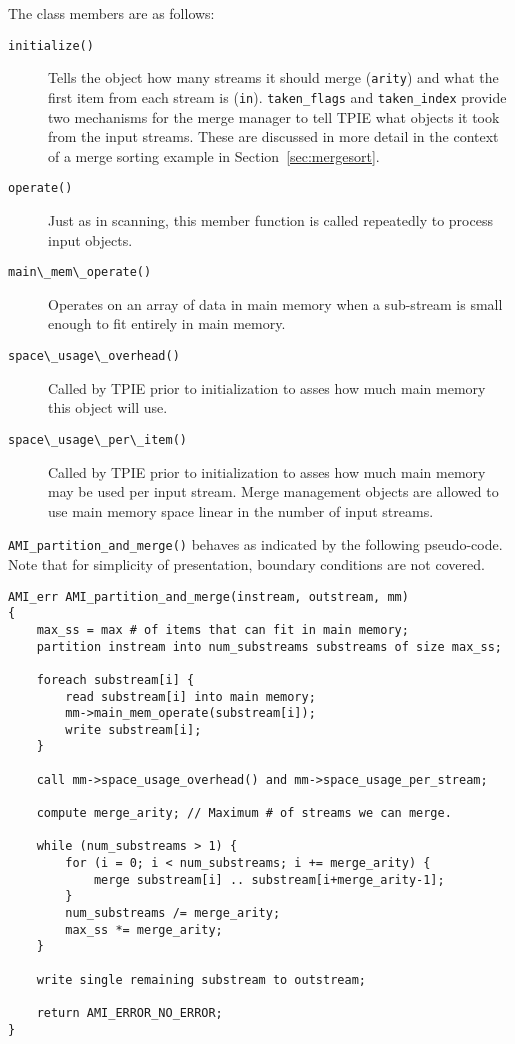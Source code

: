 The class members are as follows:

\begin{description}
\item[\verb|initialize()|] Tells the object how many streams it should
  merge (\verb|arity|) and what the first item from each stream is
  (\verb|in|).  \verb|taken_flags| and \verb|taken_index| provide two
  mechanisms for the merge manager to tell TPIE what objects it took
  from the input streams.  These are discussed in more detail in 
  the context of a merge sorting example in Section~\ref{sec:mergesort}.
\item[\verb|operate()|]
Just as in scanning, this member function is called repeatedly to process input objects.
\item[\verb|main\_mem\_operate()|]
Operates on an array of data in main memory when a sub-stream is small enough to fit entirely in main memory.
\item[\verb|space\_usage\_overhead()|]
Called by TPIE prior to initialization to asses how much main memory this object will use.
\item[\verb|space\_usage\_per\_item()|]
Called by TPIE prior to initialization to asses how much main memory may be used per input stream.  Merge management objects are allowed to use main memory space linear in the number of input streams.
\end{description}

\verb|AMI_partition_and_merge()| behaves as indicated by the following
pseudo-code.  Note that for simplicity of presentation, boundary
conditions are not covered.

\begin{verbatim}
AMI_err AMI_partition_and_merge(instream, outstream, mm)
{
    max_ss = max # of items that can fit in main memory;
    partition instream into num_substreams substreams of size max_ss;

    foreach substream[i] {
        read substream[i] into main memory;
        mm->main_mem_operate(substream[i]);
        write substream[i];
    }

    call mm->space_usage_overhead() and mm->space_usage_per_stream;
    
    compute merge_arity; // Maximum # of streams we can merge.     

    while (num_substreams > 1) {
        for (i = 0; i < num_substreams; i += merge_arity) {
            merge substream[i] .. substream[i+merge_arity-1];
        }
        num_substreams /= merge_arity;
        max_ss *= merge_arity;
    }

    write single remaining substream to outstream;
        
    return AMI_ERROR_NO_ERROR;
}
\end{verbatim}

